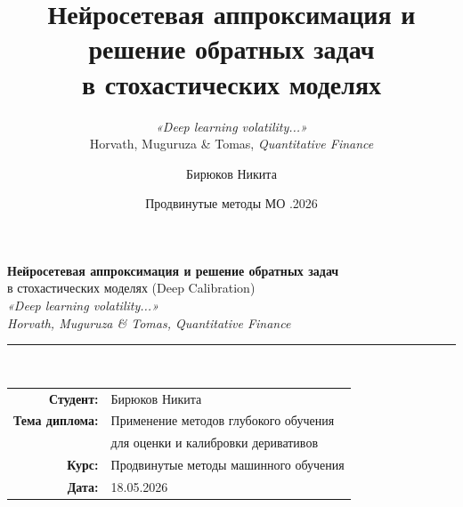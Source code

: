 \documentclass[11pt, aspectratio=169]{beamer}
\title[Deep Calibration]{%
  Нейросетевая аппроксимация и решение обратных задач\\[-2pt]
  в стохастических моделях}
\subtitle{\textit{«Deep learning volatility...»}\\[-1pt]
  Horvath, Muguruza \& Tomas, \textit{Quantitative Finance}}
\author[Бирюков Н.]{Бирюков Никита}
\institute[МФТИ]{МФТИ}
\date[18.05.2026]{Продвинутые методы МО \quad 18.05.2026}
\begin{document}

\begin{frame}
  \vspace{0.5em}
  {\centering
    {\large\bfseries\color{mlblue} Нейросетевая аппроксимация и решение обратных задач}\\[0.3em]
    {\normalsize\color{mlblue} в стохастических моделях (Deep Calibration)}\\[0.6em]
    {\small\itshape «Deep learning volatility...»\\[-1pt]
     Horvath, Muguruza \& Tomas, \textit{Quantitative Finance}}\\[1.2em]
    {\color{mlblue}\rule{0.65\textwidth}{0.4pt}}\\[0.8em]
    \begin{tabular}{rl}
      \textbf{Студент:} & Бирюков Никита \\[0.2em]
      \textbf{Тема диплома:} & Применение методов глубокого обучения \\[-1pt]
                              & для оценки и калибровки деривативов \\[0.2em]
      \textbf{Курс:} & Продвинутые методы машинного обучения \\[0.2em]
      \textbf{Дата:} & 18.05.2026 \\
    \end{tabular}
  }
\end{frame}
\end{document}
